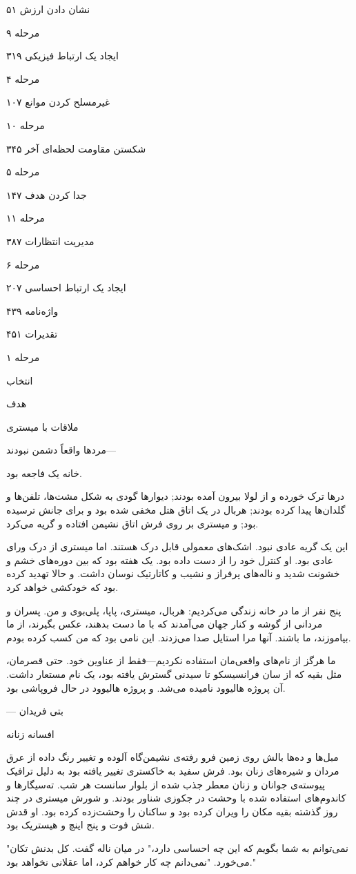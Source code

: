 نشان دادن ارزش ۵۱

مرحله ۹

ایجاد یک ارتباط فیزیکی ۳۱۹

مرحله ۴

غیرمسلح کردن موانع ۱۰۷

مرحله ۱۰

شکستن مقاومت لحظه‌ای آخر ۳۴۵

مرحله ۵

جدا کردن هدف ۱۴۷

مرحله ۱۱

مدیریت انتظارات ۳۸۷

مرحله ۶

ایجاد یک ارتباط احساسی ۲۰۷

واژه‌نامه ۴۳۹

تقدیرات ۴۵۱

مرحله ۱

انتخاب

هدف

ملاقات با میستری

مردها واقعاً دشمن نبودند—

خانه یک فاجعه بود.

درها ترک خورده و از لولا بیرون آمده بودند; دیوارها گودی به شکل مشت‌ها، تلفن‌ها و گلدان‌ها پیدا کرده بودند; هربال در یک اتاق هتل مخفی شده بود و برای جانش ترسیده بود; و میستری بر روی فرش اتاق نشیمن افتاده و گریه می‌کرد.

این یک گریه عادی نبود. اشک‌های معمولی قابل درک هستند. اما میستری از درک ورای عادی بود. او کنترل خود را از دست داده بود. یک هفته بود که بین دوره‌های خشم و خشونت شدید و ناله‌های پرفراز و نشیب و کاتارتیک نوسان داشت. و حالا تهدید کرده بود که خودکشی خواهد کرد.

پنج نفر از ما در خانه زندگی می‌کردیم: هربال، میستری، پاپا، پلی‌بوی و من. پسران و مردانی از گوشه و کنار جهان می‌آمدند که با ما دست بدهند، عکس بگیرند، از ما بیاموزند، ما باشند. آنها مرا استایل صدا می‌زدند. این نامی بود که من کسب کرده بودم.

ما هرگز از نام‌های واقعی‌مان استفاده نکردیم—فقط از عناوین خود. حتی قصرمان، مثل بقیه که از سان فرانسیسکو تا سیدنی گسترش یافته بود، یک نام مستعار داشت. آن پروژه هالیوود نامیده می‌شد. و پروژه هالیوود در حال فروپاشی بود.

— بتی فریدان

 افسانه زنانه

مبل‌ها و ده‌ها بالش روی زمین فرو رفته‌ی نشیمن‌گاه آلوده و تغییر رنگ داده از عرق مردان و شیره‌های زنان بود. فرش سفید به خاکستری تغییر یافته بود به دلیل ترافیک پیوسته‌ی جوانان و زنان معطر جذب شده از بلوار سانست هر شب. ته‌سیگارها و کاندوم‌های استفاده شده با وحشت در جکوزی شناور بودند. و شورش میستری در چند روز گذشته بقیه مکان را ویران کرده بود و ساکنان را وحشت‌زده کرده بود. او قدش شش فوت و پنج اینچ و هیستریک بود.

"نمی‌توانم به شما بگویم که این چه احساسی دارد،" در میان ناله گفت. کل بدنش تکان می‌خورد. "نمی‌دانم چه کار خواهم کرد، اما عقلانی نخواهد بود."